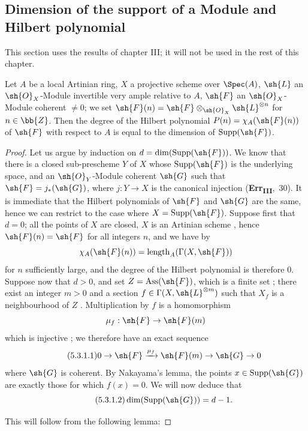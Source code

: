 \subsection{Dimension of the support of a Module and Hilbert polynomial}
\label{subsection:IV.5.3}


This section uses the results of chapter III; it will not be used in the rest of this chapter.

\begin{proposition}[5.3.1]
\label{IV.5.3.1}
Let $A$ be a local Artinian ring, $X$ a projective scheme over $\Spec(A)$, $\sh{L}$ an $\sh{O}_X$-Module invertible very ample relative to $A$, $\sh{F}$ an $\sh{O}_X$-Module coherent $\neq 0$; we set $\sh{F}(n)=\sh{F}\otimes_{\sh{O}_X}\sh{L}^{\otimes n}$ for $n\in\bb{Z}$.
Then the degree of the Hilbert polynomial $P(n)=\chi_A(\sh{F}(n))$ of $\sh{F}$ with respect to $A$  is equal to the dimension of $\operatorname{Supp}(\sh{F})$.
\end{proposition}

\begin{proof}
Let us argue by induction on $d=\dim(\operatorname{Supp}(\sh{F}))$.
We know that there is a closed sub-prescheme $Y$ of $X$ whose $\operatorname{Supp}(\sh{F})$ is the underlying space, and an $\sh{O}_Y$-Module coherent $\sh{G}$ such that $\sh{F}=j_*(\sh{G})$, where $j:Y\to X$ is the canonical injection (\textbf{Err}\textsubscript{\textbf{III}},~30).
It is immediate that the Hilbert polynomials of $\sh{F}$ and $\sh{G}$ are the same, hence we can restrict to the case where $X=\operatorname{Supp}(\sh{F})$.
Suppose first that $d=0$; all the points of $X$ are closed, $X$ is an Artinian scheme , hence $\sh{F}(n)=\sh{F}$ for all integers $n$, and we have by 
\[
  \chi_A(\sh{F}(n)) = \operatorname{length}_A(\Gamma(X,\sh{F}))
\]
for $n$ sufficiently large, and the degree of the Hilbert polynomial is therefore $0$.
Suppose now that $d>0$, and set $Z=\operatorname{Ass}(\sh{F})$, which is a finite set ; there exist an integer $m>0$ and a section $f\in\Gamma(X,\sh{L}^{\otimes m})$ such that $X_f$ is a neighbourhood of $Z$ .
Multiplication by $f$ is a homomorphism
\[
  \mu_f : \sh{F} \to \sh{F}(m)
\]
which is injective ; we therefore have an exact sequence
\[
\tag{5.3.1.1}\label{IV.5.3.1.1}
  0\to\sh{F}\xrightarrow{\mu_f}\sh{F}(m)\to\sh{G}\to 0
\]
where $\sh{G}$ is coherent.
By Nakayama's lemma, the points $x\in\operatorname{Supp}(\sh{G})$ are exactly those for which $f(x)=0$.
We will now deduce that
\[
\tag{5.3.1.2}\label{IV.5.3.1.2}
  \dim(\operatorname{Supp}(\sh{G})) = d-1.
\]

This will follow from the following lemma:
\end{proof}

